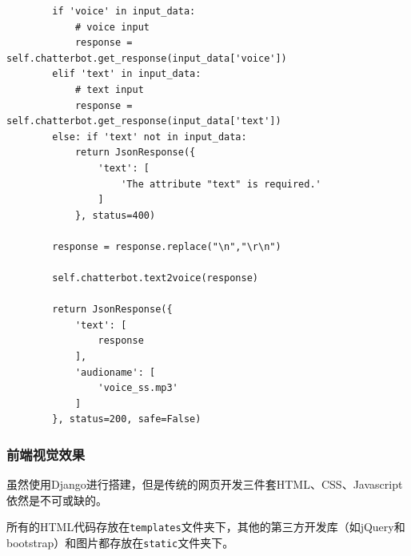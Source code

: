 \documentclass[logo,reportComp]{thesis}
\begin{document}
\begin{itemize}
\begin{lstlisting}
        if 'voice' in input_data:
            # voice input
            response = self.chatterbot.get_response(input_data['voice'])
        elif 'text' in input_data:
            # text input
            response = self.chatterbot.get_response(input_data['text'])
        else: if 'text' not in input_data:
            return JsonResponse({
                'text': [
                    'The attribute "text" is required.'
                ]
            }, status=400)

        response = response.replace("\n","\r\n")

        self.chatterbot.text2voice(response)

        return JsonResponse({
            'text': [
                response
            ],
            'audioname': [
                'voice_ss.mp3'
            ]
        }, status=200, safe=False)
\end{lstlisting}
\end{itemize}

\subsubsection{前端视觉效果}
虽然使用Django进行搭建，但是传统的网页开发三件套HTML、CSS、Javascript依然是不可或缺的。

所有的HTML代码存放在\verb'templates'文件夹下，其他的第三方开发库（如jQuery和bootstrap）和图片都存放在\verb'static'文件夹下。
\end{document}
